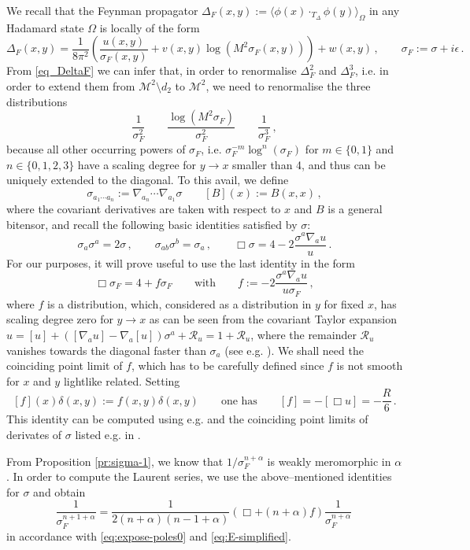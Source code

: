 \documentclass[a4paper,10pt,twoside]{article}
\numberwithin{equation}{section}
\newcounter{and}
\def\M{\mathcal{M}}
\def\R{\mathcal{R}}
\def\beq{\begin{equation}}
\def\eeq{\end{equation}}
\theoremstyle{plain}
\theoremstyle{definition}
\begin{document}
We recall that the Feynman propagator $\Delta_F(x,y):=\langle\phi(x)\cdot_{T_\Delta}\phi(y)\rangle_\Omega$ in any Hadamard state $\Omega$ is locally of the form
\beq\label{eq_DeltaF}
\Delta_F(x,y)=\frac{1}{8\pi^2}\left(\frac{u(x,y)}{\sigma_F(x,y)}+v(x,y)\log(M^2 \sigma_F(x,y))\right)+w(x,y)\,,\qquad\sigma_F:=\sigma+i\epsilon\,.
\eeq
From \eqref{eq_DeltaF} we can infer that, in order to renormalise $\Delta^2_F$ and $\Delta^3_F$, i.e. in order to extend them from $\M^2\setminus d_2$ to $\M^2$, we need to renormalise the three distributions
\beq\label{eq_sigma_problematic}
\frac{1}{\sigma_F^2}\qquad \frac{\log \left(M^2 \sigma_F\right)}{\sigma_F^2}\qquad \frac{1}{\sigma_F^3}\,,
\eeq
because all other occurring powers of $\sigma_F$, i.e. $\sigma^{-m}_F\log^n (\sigma_F)$ for $m\in\{0,1\}$ and $n\in\{0,1,2,3\}$ have a scaling degree for $y\to x$ smaller than 4, and thus can be uniquely extended to the diagonal.
To this avail, we define
$$\sigma_{a_1\cdots a_n}:=\nabla_{a_n}\cdots\nabla_{a_1}\sigma\qquad [B](x):=B(x,x)\,,$$
where the covariant derivatives are taken with respect to $x$ and $B$ is a general bitensor, and recall the following basic identities satisfied by $\sigma$:
\begin{equation}\label{eq_basicidentities}
\sigma_a \sigma^a  = 2\sigma\,,\qquad \sigma_{ab}\sigma^b=\sigma_a\,,\qquad \Box\sigma = 4 - 2 \frac{\sigma^a \nabla_a u}{u}\,.
\end{equation}
For our purposes, it will prove useful to use the last identity in the form
\beq\label{eq_def_f}\Box \sigma_F = 4 + f \sigma_F\qquad\text{with}\qquad f:=- 2 \frac{\sigma^a \nabla_a u}{u\sigma_F}\,,\eeq
where $f$ is a distribution, which, considered as a distribution in $y$ for fixed $x$, has scaling degree zero for $y\to x$ as can be seen from the covariant Taylor expansion $u=[u]+\left([\nabla_a u]-\nabla_a[u]\right)\sigma^a + \R_u=1+\R_u$, where the remainder $\R_u$ vanishes towards the diagonal faster than $\sigma_a$  (see e.g. \cite[Section 5]{Poisson:2011nh}).
We shall need the coinciding point limit of $f$, which has to be carefully defined since $f$ is not smooth for $x$ and $y$ lightlike related.  Setting
\beq\label{eq_coincidingf}[f](x)\delta(x,y) := f(x,y) \delta(x,y)\qquad \text{one has}\qquad [f]=-[\Box u]=-\frac{R}{6}\,.\eeq 
This identity can be computed using e.g. \cite[Lemma III.3.2.6]{Hack:2010iw} and the coinciding point limits of derivates of $\sigma$ listed e.g. in \cite[Section III.1.2]{Hack:2010iw}. 


From Proposition \ref{pr:sigma-1}, we know that $1/\sigma^{n+\alpha}_F$ is weakly meromorphic in $\alpha$. In order to compute the Laurent series, we use the above--mentioned identities for $\sigma$ and obtain
$$
\frac{1}{\sigma^{n+1+\alpha}_F}=\frac{1}{2(n+\alpha)(n-1+\alpha)}\left(\Box+(n+\alpha)f\right)\frac{1}{\sigma^{n+\alpha}_F}\,
$$
in accordance with \eqref{eq:expose-poles0} and \eqref{eq:E-simplified}.
\end{document}
